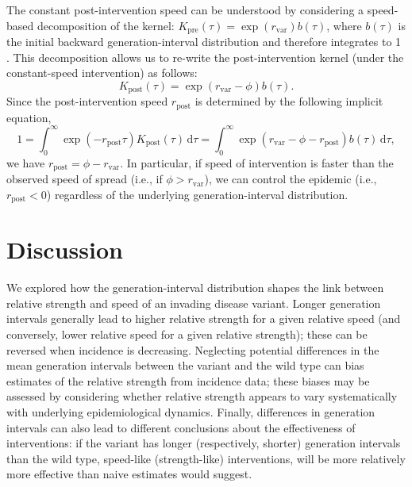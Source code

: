 \documentclass[12pt]{article}
\newcommand{\vvvar}{\mathrm{var}}
\newcommand{\rx}[1]{\ensuremath{{r}_{#1}}\xspace}
\newcommand{\ry}[1]{\rx{\mathrm{#1}}}
\newcommand{\rv}{\rx{\vvvar}}
\newcommand{\dd}[1]{\ensuremath{\, \mathrm{d}#1}}
\newcommand{\dtau}{\dd{\tau}}
\begin{document}
The constant post-intervention speed can be understood by considering a speed-based decomposition of the kernel: $K_{\mathrm{pre}}(\tau) = \exp(\rv) b(\tau)$, where $b(\tau)$ is the initial backward generation-interval distribution and therefore integrates to 1 \citep{doi:10.1098/rspb.2020.1556}.
This decomposition allows us to re-write the post-intervention kernel (under the constant-speed intervention) as follows:
\begin{equation}
K_{\mathrm{post}}(\tau) = \exp(\rv-\phi) b(\tau).
\end{equation}
Since the post-intervention speed $\ry{post}$ is determined by the following implicit equation,
\begin{equation}
1 = \int_0^\infty \exp(-\ry{post} \tau) K_{\mathrm{post}}(\tau) \dtau = \int_0^\infty \exp(\rv-\phi-\ry{post}) b(\tau)  \dtau,
\end{equation}
we have $\ry{post} = \phi - \rv$. In particular, if speed of intervention is faster than the observed speed of spread (i.e., if $\phi > \rv$), we can control the epidemic (i.e., $\ry{post} < 0$) regardless of the underlying generation-interval distribution.

\section{Discussion}

We explored how the generation-interval distribution shapes the link between relative strength and speed of an invading disease variant.
Longer generation intervals generally lead to higher relative strength for a given relative speed (and conversely, lower relative speed for a given relative strength); these can be reversed when incidence is decreasing.
Neglecting potential differences in the mean generation intervals between the variant and the wild type can bias estimates of the relative strength from incidence data;
these biases may be assessed by considering whether relative strength appears to vary systematically with underlying epidemiological dynamics.
Finally, differences in generation intervals can also lead to different conclusions about the effectiveness of interventions:
if the variant has longer (respectively, shorter) generation intervals than the wild type, speed-like (strength-like) interventions, will be more relatively more effective than naive estimates would suggest.
\end{document}
